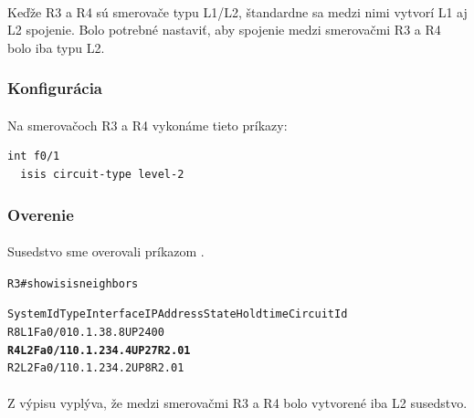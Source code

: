 \documentclass[12pt,twoside,a4paper]{report}
\begin{document}
\paragraph{}
Keďže R3 a R4 sú smerovače typu L1/L2, štandardne sa medzi nimi vytvorí L1 aj L2 spojenie. Bolo potrebné nastaviť, aby spojenie medzi smerovačmi R3 a R4 bolo iba typu L2.

\subsubsection{Konfigurácia}
\paragraph{}
Na smerovačoch R3 a R4 vykonáme tieto príkazy:

\noindent
{\selectfont
\begin{small}
\begin{verbatim}
int f0/1
  isis circuit-type level-2
\end{verbatim}
\end{small}
}

\subsubsection{Overenie}
\paragraph{}
Susedstvo sme overovali príkazom .

\noindent
{\selectfont
\begin{small}
\begin{alltt}
R3#show isis neighbors

System Id      Type Interface   IP Address      State Holdtime Circuit Id
R8             L1   Fa0/0       10.1.38.8       UP    24       00
\textbf{R4             L2   Fa0/1       10.1.234.4      UP    27       R2.01}
R2             L2   Fa0/1       10.1.234.2      UP    8        R2.01
\end{alltt}
\end{small}
}

\paragraph{}
Z výpisu vyplýva, že medzi smerovačmi R3 a R4 bolo vytvorené iba L2 susedstvo.
\end{document}
